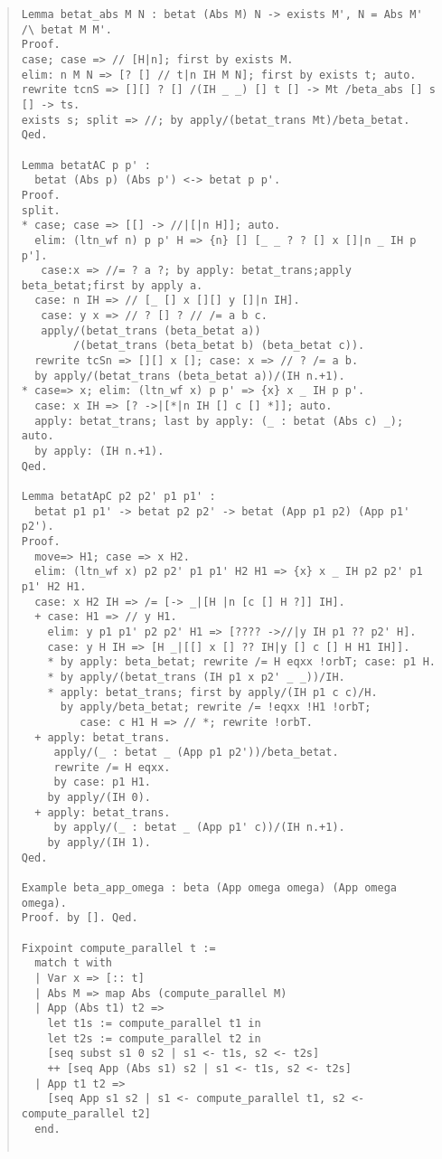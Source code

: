 \documentclass[12pt, titlepage]{ltjsarticle}
\begin{document}
\begin{quote}
\begin{verbatim}
Lemma betat_abs M N : betat (Abs M) N -> exists M', N = Abs M' /\ betat M M'.
Proof.
case; case => // [H|n]; first by exists M.
elim: n M N => [? [] // t|n IH M N]; first by exists t; auto.
rewrite tcnS => [][] ? [] /(IH _ _) [] t [] -> Mt /beta_abs [] s [] -> ts.
exists s; split => //; by apply/(betat_trans Mt)/beta_betat.
Qed.

Lemma betatAC p p' :
  betat (Abs p) (Abs p') <-> betat p p'.
Proof.
split.
* case; case => [[] -> //|[|n H]]; auto.
  elim: (ltn_wf n) p p' H => {n} [] [_ _ ? ? [] x []|n _ IH p p'].
   case:x => //= ? a ?; by apply: betat_trans;apply beta_betat;first by apply a.
  case: n IH => // [_ [] x [][] y []|n IH].
   case: y x => // ? [] ? // /= a b c.
   apply/(betat_trans (beta_betat a))
        /(betat_trans (beta_betat b) (beta_betat c)).
  rewrite tcSn => [][] x []; case: x => // ? /= a b.
  by apply/(betat_trans (beta_betat a))/(IH n.+1).
* case=> x; elim: (ltn_wf x) p p' => {x} x _ IH p p'.
  case: x IH => [? ->|[*|n IH [] c [] *]]; auto.
  apply: betat_trans; last by apply: (_ : betat (Abs c) _); auto.
  by apply: (IH n.+1).
Qed.

Lemma betatApC p2 p2' p1 p1' :
  betat p1 p1' -> betat p2 p2' -> betat (App p1 p2) (App p1' p2').
Proof.
  move=> H1; case => x H2.
  elim: (ltn_wf x) p2 p2' p1 p1' H2 H1 => {x} x _ IH p2 p2' p1 p1' H2 H1.
  case: x H2 IH => /= [-> _|[H |n [c [] H ?]] IH].
  + case: H1 => // y H1.
    elim: y p1 p1' p2 p2' H1 => [???? ->//|y IH p1 ?? p2' H].
    case: y H IH => [H _|[[] x [] ?? IH|y [] c [] H H1 IH]].
    * by apply: beta_betat; rewrite /= H eqxx !orbT; case: p1 H.
    * by apply/(betat_trans (IH p1 x p2' _ _))/IH.
    * apply: betat_trans; first by apply/(IH p1 c c)/H.
      by apply/beta_betat; rewrite /= !eqxx !H1 !orbT;
         case: c H1 H => // *; rewrite !orbT.
  + apply: betat_trans.
     apply/(_ : betat _ (App p1 p2'))/beta_betat.
     rewrite /= H eqxx.
     by case: p1 H1.
    by apply/(IH 0).
  + apply: betat_trans.
     by apply/(_ : betat _ (App p1' c))/(IH n.+1).
    by apply/(IH 1).
Qed.

Example beta_app_omega : beta (App omega omega) (App omega omega).
Proof. by []. Qed.

Fixpoint compute_parallel t :=
  match t with
  | Var x => [:: t]
  | Abs M => map Abs (compute_parallel M)
  | App (Abs t1) t2 =>
    let t1s := compute_parallel t1 in
    let t2s := compute_parallel t2 in
    [seq subst s1 0 s2 | s1 <- t1s, s2 <- t2s]
    ++ [seq App (Abs s1) s2 | s1 <- t1s, s2 <- t2s]
  | App t1 t2 =>
    [seq App s1 s2 | s1 <- compute_parallel t1, s2 <- compute_parallel t2]
  end.


\end{verbatim}
\end{quote}
\end{document}
